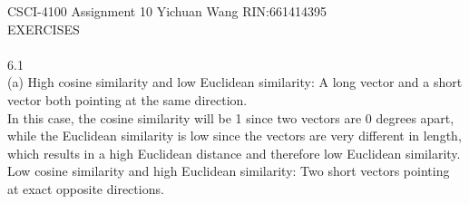 \documentclass[12pt]{article}
\begin{document}
CSCI-4100 Assignment 10 Yichuan Wang RIN:661414395\\
EXERCISES\\\\
6.1\\%
(a) High cosine similarity and low Euclidean similarity: A long vector and a short vector both pointing at the same direction. \\

	In this case, the cosine similarity will be 1 since two vectors are 0 degrees apart, while the Euclidean similarity is low since the vectors are very different in length, which results in a high Euclidean distance and therefore low Euclidean similarity. \\
	
	Low cosine similarity and high Euclidean similarity: Two short vectors pointing at exact opposite directions.\\
	
\end{document}

